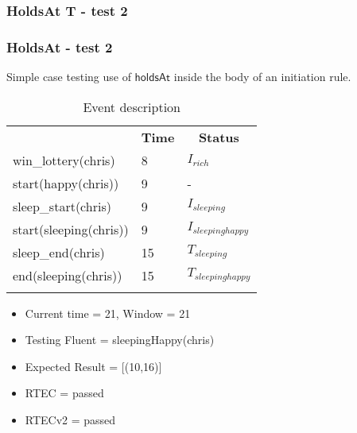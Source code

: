 \documentclass[8pt]{beamer}
\def \patsize {}
\def\holdsAt{\textsf{\patsize holdsAt}}
\begin{document}
    \begin{frame}
        \frametitle{HoldsAt T - test 2}
        \subsubsection{HoldsAt - test 2}
        \small Simple case testing use of $\holdsAt$ inside the body of an initiation rule.\linebreak
        \begin{minipage}{0.48\linewidth}
            \begin{table}[t!]
                \caption{Event description}
                \begin{center}

                    \begin{tabular}{lll}
                        \hline\noalign{\smallskip}
                        \multicolumn{1}{l}{\textbf{Event}} & \multicolumn{1}{c}{\textbf{Time}}  & \multicolumn{1}{c}{\textbf{Status}}   \\
                        win\_lottery(chris) &8& $I_{rich}$\\
                        start(happy(chris)) &9& -\\
                        sleep\_start(chris) &9& $I_{sleeping}$\\
                        start(sleeping(chris)) &9& $I_{sleepinghappy}$\\

                        sleep\_end(chris)  &15&$T_{sleeping}$\\
                        end(sleeping(chris)) &15& $T_{sleepinghappy}$\\

                        \noalign{\smallskip}
                        \hline
                    \end{tabular}
                \end{center}
            \end{table}
            \begin{itemize}

                \item Current time = 21, Window = 21
                \item Testing Fluent = sleepingHappy(chris)
                \item Expected Result = [(10,16)]
                \item RTEC = passed
                \item RTECv2 = passed
            \end{itemize}
        \end{minipage}
        \begin{minipage}{0.48\linewidth}



\end{minipage}
\end{frame}
\end{document}
